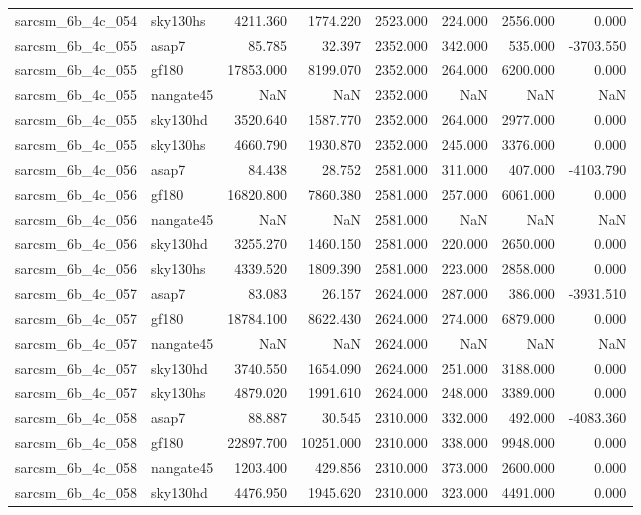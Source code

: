 \begin{tabular}{llrrrrrr}
sarcsm\_6b\_4c\_054 & sky130hs & 4211.360 & 1774.220 & 2523.000 & 224.000 & 2556.000 & 0.000 \\
sarcsm\_6b\_4c\_055 & asap7 & 85.785 & 32.397 & 2352.000 & 342.000 & 535.000 & -3703.550 \\
sarcsm\_6b\_4c\_055 & gf180 & 17853.000 & 8199.070 & 2352.000 & 264.000 & 6200.000 & 0.000 \\
sarcsm\_6b\_4c\_055 & nangate45 & NaN & NaN & 2352.000 & NaN & NaN & NaN \\
sarcsm\_6b\_4c\_055 & sky130hd & 3520.640 & 1587.770 & 2352.000 & 264.000 & 2977.000 & 0.000 \\
sarcsm\_6b\_4c\_055 & sky130hs & 4660.790 & 1930.870 & 2352.000 & 245.000 & 3376.000 & 0.000 \\
sarcsm\_6b\_4c\_056 & asap7 & 84.438 & 28.752 & 2581.000 & 311.000 & 407.000 & -4103.790 \\
sarcsm\_6b\_4c\_056 & gf180 & 16820.800 & 7860.380 & 2581.000 & 257.000 & 6061.000 & 0.000 \\
sarcsm\_6b\_4c\_056 & nangate45 & NaN & NaN & 2581.000 & NaN & NaN & NaN \\
sarcsm\_6b\_4c\_056 & sky130hd & 3255.270 & 1460.150 & 2581.000 & 220.000 & 2650.000 & 0.000 \\
sarcsm\_6b\_4c\_056 & sky130hs & 4339.520 & 1809.390 & 2581.000 & 223.000 & 2858.000 & 0.000 \\
sarcsm\_6b\_4c\_057 & asap7 & 83.083 & 26.157 & 2624.000 & 287.000 & 386.000 & -3931.510 \\
sarcsm\_6b\_4c\_057 & gf180 & 18784.100 & 8622.430 & 2624.000 & 274.000 & 6879.000 & 0.000 \\
sarcsm\_6b\_4c\_057 & nangate45 & NaN & NaN & 2624.000 & NaN & NaN & NaN \\
sarcsm\_6b\_4c\_057 & sky130hd & 3740.550 & 1654.090 & 2624.000 & 251.000 & 3188.000 & 0.000 \\
sarcsm\_6b\_4c\_057 & sky130hs & 4879.020 & 1991.610 & 2624.000 & 248.000 & 3389.000 & 0.000 \\
sarcsm\_6b\_4c\_058 & asap7 & 88.887 & 30.545 & 2310.000 & 332.000 & 492.000 & -4083.360 \\
sarcsm\_6b\_4c\_058 & gf180 & 22897.700 & 10251.000 & 2310.000 & 338.000 & 9948.000 & 0.000 \\
sarcsm\_6b\_4c\_058 & nangate45 & 1203.400 & 429.856 & 2310.000 & 373.000 & 2600.000 & 0.000 \\
sarcsm\_6b\_4c\_058 & sky130hd & 4476.950 & 1945.620 & 2310.000 & 323.000 & 4491.000 & 0.000 \\

\end{tabular}
